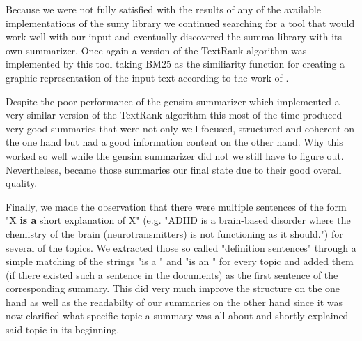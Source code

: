 Because we were not fully satisfied with the results of any of the available implementations of the sumy library we continued searching for a tool that would work well with our input and eventually discovered the summa library with its own summarizer. Once again a version of the TextRank algorithm was implemented by this tool taking BM25 as the similiarity function for creating a graphic representation of the input text according to the work of \citet{DBLP:journals/corr/BarriosLAW16}. 

Despite the poor performance of the gensim summarizer which implemented a very similar version of the TextRank algorithm this most of the time produced very good summaries that were not only well focused, structured and coherent on the one hand but had a good information content on the other hand. Why this worked so well while the gensim summarizer did not we still have to figure out. Nevertheless, became those summaries our final state due to their good overall quality.  
 
Finally, we made the observation that there were multiple sentences of the form "X \textbf{is a} short explanation of X" (e.g. "ADHD is a brain-based disorder where the chemistry of the brain (neurotransmitters) is not functioning as it should.") for several of the topics. We extracted those so called "definition sentences" through a simple matching of the strings "is a " and "is an " for every topic and added them (if there existed such a sentence in the documents) as the first sentence of the corresponding summary. This did very much improve the structure on the one hand as well as the readabilty of our summaries on the other hand since it was now clarified what specific topic a summary was all about and shortly explained said topic in its beginning.
